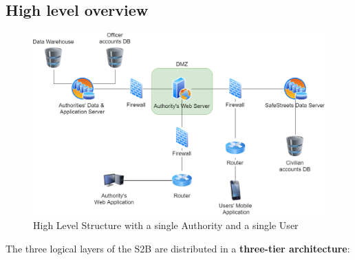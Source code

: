 \documentclass[12pt,a4paper]{article}
\begin{document}
\subsection{High level overview}
			\begin{figure}[H]
				\centering
					\begin{adjustwidth}{-25mm}{-25mm}
					        \includegraphics[width=.9\paperwidth,keepaspectratio]{Images/highlevel}
					\end{adjustwidth}
				\caption{High Level Structure with a single Authority and a single User}
			\end{figure}
The three logical layers of the S2B are distributed in a \textbf{three-tier architecture}:
\end{document}
